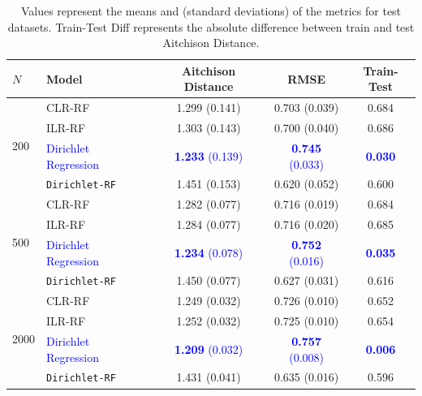 \begin{frame}{}
{  \begin{table}[htbp]
  \centering\small
  \begin{tabular}{|l|l|c|c|c|}
    \hline
    $N$ & Model & Aitchison Distance & RMSE & Train-Test \\
    \hline
    \multirow{4}{*}{200}
      & CLR-RF              & 1.299 (0.141) & 0.703 (0.039) & 0.684 \\
      & ILR-RF              & 1.303 (0.143) & 0.700 (0.040) & 0.686 \\
      & \textcolor{blue}{Dirichlet Regression} & \textcolor{blue}{\textbf{1.233} (0.139)} & \textcolor{blue}{\textbf{0.745} (0.033)} & \textcolor{blue}{\textbf{0.030}} \\
      & \texttt{Dirichlet-RF} & 1.451 (0.153) & 0.620 (0.052) & 0.600 \\
    \hline
    \multirow{4}{*}{500}
      & CLR-RF              & 1.282 (0.077) & 0.716 (0.019) & 0.684 \\
      & ILR-RF              & 1.284 (0.077) & 0.716 (0.020) & 0.685 \\
      & \textcolor{blue}{Dirichlet Regression} & \textcolor{blue}{\textbf{1.234} (0.078)} & \textcolor{blue}{\textbf{0.752} (0.016)} & \textcolor{blue}{\textbf{0.035}} \\
      & \texttt{Dirichlet-RF} & 1.450 (0.077) & 0.627 (0.031) & 0.616 \\
    \hline
    \multirow{4}{*}{2000}
      & CLR-RF              & 1.249 (0.032) & 0.726 (0.010) & 0.652 \\
      & ILR-RF              & 1.252 (0.032) & 0.725 (0.010) & 0.654 \\
      & \textcolor{blue}{Dirichlet Regression} & \textcolor{blue}{\textbf{1.209} (0.032)} & \textcolor{blue}{\textbf{0.757} (0.008)} & \textcolor{blue}{\textbf{0.006}} \\
      & \texttt{Dirichlet-RF} & 1.431 (0.041) & 0.635 (0.016) & 0.596 \\
    \hline
  \end{tabular}
  \caption{Values represent the means and (standard deviations) of the metrics for test datasets. Train-Test Diff represents the absolute difference between train and test Aitchison Distance.}
  \label{tab:performance-comparison1}
  \end{table}
}


\end{frame}



